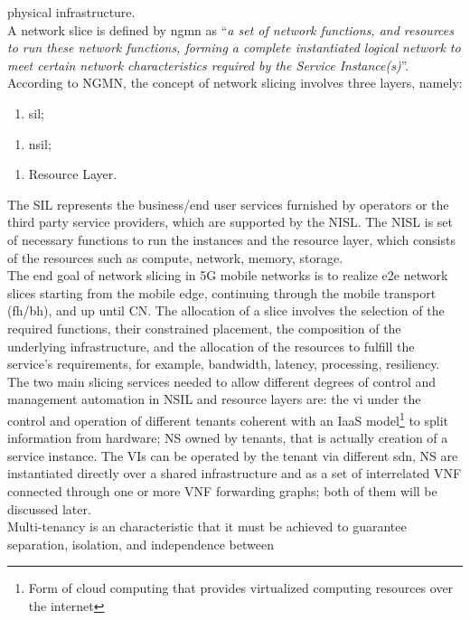 \documentclass[a4paper,12pt]{report} %
\begin{document}
physical infrastructure.\\
A network slice is defined by \gls{ngmn} as “\textit{a set of network functions, and
resources to run these network functions, forming a complete instantiated
logical network to meet certain network characteristics required by the Service
Instance(s)}”.\\
According to NGMN, the concept of network slicing involves three layers,
namely:
\begin{enumerate}[1]
\item \gls{sil};
\end{enumerate}
\begin{enumerate}[2]
\item \gls{nsil};
\end{enumerate}
\begin{enumerate}[3]
\item Resource Layer.
\end{enumerate}
The SIL represents the business/end user services furnished by operators or the third party service providers, which are supported by the NISL. The NISL is set of necessary functions to run the instances and the resource layer, which consists of the
resources such as compute, network, memory, storage.\\
The end goal of network slicing in 5G mobile networks is to realize
\gls{e2e} network slices starting from the mobile edge, continuing
through the mobile transport (\gls{fh}/\gls{bh}), and up until
\gls{CN}. The allocation of a slice involves the selection of the
required functions, their constrained placement, the composition of the underlying infrastructure, and the allocation of the resources to fulfill the service's requirements, for example, bandwidth, latency, processing, resiliency.\\
The two main slicing services needed to allow different degrees
of control and management automation in NSIL and resource layers are: the \gls{vi} under the control and operation
of different tenants coherent with an \gls{IaaS} model\footnote{Form of cloud computing that provides virtualized computing resources over the internet} to split information from hardware; \gls{NS} owned by tenants, that is actually creation of a service instance.
The VIs can be operated by the tenant via different \gls{sdn}, NS are instantiated directly over a shared infrastructure
and as a set of interrelated \gls{VNF} connected through
one or more VNF forwarding graphs; both of them will be discussed later.\\
Multi-tenancy is an characteristic that it must be achieved to guarantee separation, isolation, and independence between
\end{document}
